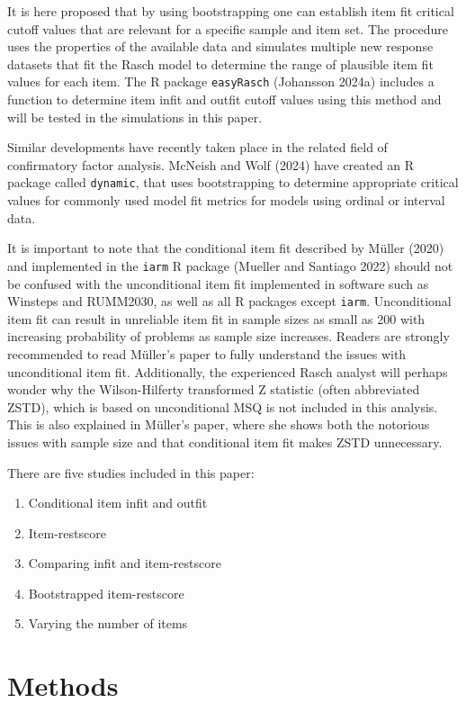 \documentclass[
  letterpaper,
  DIV=11,
  numbers=noendperiod]{scrartcl}
\providecommand{\tightlist}{%
  \setlength{\itemsep}{0pt}\setlength{\parskip}{0pt}}\usepackage{longtable,booktabs,array}
\begin{document}
It is here proposed that by using bootstrapping one can establish item
fit critical cutoff values that are relevant for a specific sample and
item set. The procedure uses the properties of the available data and
simulates multiple new response datasets that fit the Rasch model to
determine the range of plausible item fit values for each item. The R
package \texttt{easyRasch} (Johansson 2024a) includes a function to
determine item infit and outfit cutoff values using this method and will
be tested in the simulations in this paper.

Similar developments have recently taken place in the related field of
confirmatory factor analysis. McNeish and Wolf (2024) have created an R
package called \texttt{dynamic}, that uses bootstrapping to determine
appropriate critical values for commonly used model fit metrics for
models using ordinal or interval data.

It is important to note that the conditional item fit described by
Müller (2020) and implemented in the \texttt{iarm} R package (Mueller
and Santiago 2022) should not be confused with the unconditional item
fit implemented in software such as Winsteps and RUMM2030, as well as
all R packages except \texttt{iarm}. Unconditional item fit can result
in unreliable item fit in sample sizes as small as 200 with increasing
probability of problems as sample size increases. Readers are strongly
recommended to read Müller's paper to fully understand the issues with
unconditional item fit. Additionally, the experienced Rasch analyst will
perhaps wonder why the Wilson-Hilferty transformed Z statistic (often
abbreviated ZSTD), which is based on unconditional MSQ is not included
in this analysis. This is also explained in Müller's paper, where she
shows both the notorious issues with sample size and that conditional
item fit makes ZSTD unnecessary.

There are five studies included in this paper:

\begin{enumerate}
\def\labelenumi{\arabic{enumi}.}
\tightlist
\item
  Conditional item infit and outfit
\item
  Item-restscore
\item
  Comparing infit and item-restscore
\item
  Bootstrapped item-restscore
\item
  Varying the number of items
\end{enumerate}

\section{Methods}\label{methods}
\end{document}

